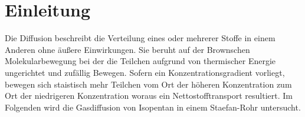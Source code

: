 


\section{Einleitung}

Die Diffusion beschreibt die Verteilung eines oder mehrerer Stoffe in einem Anderen ohne äußere Einwirkungen. Sie beruht auf der Brownschen Molekularbewegung bei der die Teilchen aufgrund von thermischer Energie ungerichtet und zufällig Bewegen. Sofern ein Konzentrationsgradient vorliegt, bewegen sich staistisch mehr Teilchen  vom Ort der höheren Konzentration zum Ort der niedrigeren Konzentration woraus ein Nettostofftransport resultiert. Im Folgenden wird die Gasdiffusion von Isopentan in einem Staefan-Rohr untersucht.



